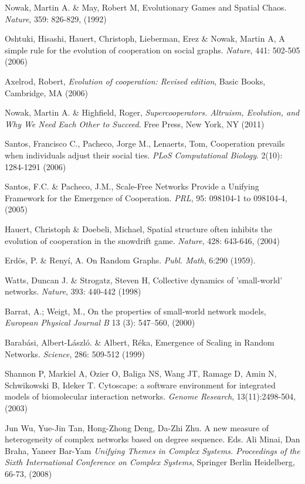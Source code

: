 \documentclass[11pt]{article}
\begin{document}
\begin{thebibliography}{100}
 Nowak, Martin A. \& May, Robert M, Evolutionary
  Games and Spatial Chaos. \textit{Nature}, 359: 826-829, (1992)

 Oshtuki, Hisashi, Hauert, Christoph, Lieberman, Erez \& Nowak, Martin A, A simple rule for the evolution of cooperation on social graphs. \textit{Nature}, 441: 502-505 (2006)

 Axelrod, Robert, \textit{Evolution of cooperation: Revised edition}, Basic Books, Cambridge, MA (2006)

 Nowak, Martin A. \& Highfield, Roger,
  \textit{Supercooperators. Altruism, Evolution, and Why We Need Each
    Other to Succeed}. Free Press, New York, NY  (2011)

 Santos, Francisco C., Pacheco, Jorge M., Lenaerts, Tom, Cooperation prevails when individuals adjust their social ties. \textit{PLoS Computational Biology}. 2(10): 1284-1291 (2006)

 Santos, F.C. \& Pacheco, J.M., Scale-Free
  Networks Provide a Unifying Framework for the Emergence of
  Cooperation. \textit{PRL}, 95: 098104-1 to 098104-4, (2005) 

 Hauert, Christoph \& Doebeli, Michael, Spatial
  structure often inhibits the evolution of cooperation in the
  snowdrift game. \textit{Nature}, 428: 643-646,  (2004)

 Erd\"{o}s, P. \& Reny\'i, A. On Random Graphs. \textit{Publ. Math}, 6:290 (1959).

 Watts, Duncan J. \& Strogatz, Steven H, Collective dynamics
  of 'small-world' networks. \textit{Nature}, 393: 440-442 (1998)
  
   Barrat, A.; Weigt, M., On the properties of small-world network models, \textit{European Physical Journal B} 13 (3): 547–560, (2000)

 Barab\'asi, Albert-L\'aszl\'o. \& Albert, R\'eka, Emergence of Scaling in Random Networks. \textit{Science}, 286: 509-512 (1999)
  
 Shannon P, Markiel A, Ozier O, Baliga NS, Wang JT, Ramage D, Amin N, Schwikowski B, Ideker T. Cytoscape: a software environment for integrated models of biomolecular interaction networks. \textit{Genome Research}, 13(11):2498-504, (2003)

Jun Wu, Yue-Jin Tan, Hong-Zhong Deng, Da-Zhi Zhu. A new measure of heterogeneity of complex networks based on degree sequence.  Eds. Ali Minai, Dan Braha, Yaneer Bar-Yam  \emph{Unifying Themes in Complex Systems. Proceedings of the Sixth International Conference on Complex Systems}, Springer Berlin Heidelberg, 66-73, (2008)
  

\end{thebibliography}
\end{document}
